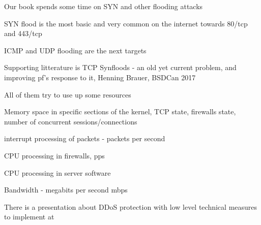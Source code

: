 \documentclass[Screen16to9,17pt]{foils}
\begin{document}
\begin{list2}
\item Our book spends some time on SYN and other flooding attacks
\item SYN flood is the most basic and very common on the internet towards 80/tcp and 443/tcp
\item ICMP and UDP flooding are the next targets
\item Supporting litterature is TCP Synfloods - an old yet current problem, and improving pf's response to it, Henning Brauer, BSDCan 2017
\item All of them try to use up some resources
\begin{list2}
\item Memory space in specific sections of the kernel, TCP state, firewalls state, number of concurrent sessions/connections
\item interrupt processing of packets - packets per second
\item CPU processing in firewalls, pps
\item CPU processing in server software
\item Bandwidth - megabits per second mbps
\end{list2}
\end{list2}

There is a presentation about DDoS protection with low level technical measures to implement at\\
{\footnotesize {}}


\slidenext
\end{document}
